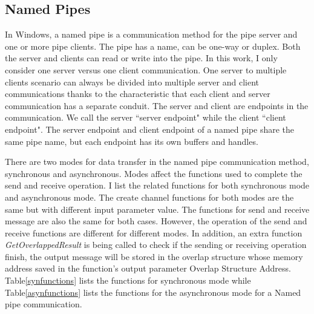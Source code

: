 \subsection{Named Pipes}
In Windows, a named pipe is a communication method for the pipe server and one or more pipe clients. The pipe has a name, can be one-way or duplex. Both the server and clients can read or write into the pipe.\cite{WinNamedpipe} In this work, I only consider one server versus one client communication. One server to multiple clients scenario can always be divided into multiple server and client communications thanks to the characteristic that each client and server communication has a separate conduit. The server and client are endpoints in the communication. We call the server ``server endpoint" while the client ``client endpoint".  The server endpoint and client endpoint of a named pipe share the same pipe name, but each endpoint has its own buffers and handles. 

There are two modes for data transfer in the named pipe communication method, synchronous and asynchronous.  Modes affect the functions used to complete the send and receive operation. I list the related functions for both synchronous mode and asynchronous mode. The create channel functions for both modes are the same but with different input parameter value. The functions for send and receive message are also the same for both cases. However, the operation of the send and receive functions are different for different modes. In addition, an extra function \textit{GetOverlappedResult} is being called to check if the sending or receiving operation finish, the output message will be stored in the overlap structure whose memory address saved in the function's output parameter Overlap Structure Address. Table\ref{synfunctions} lists the functions for synchronous mode while Table\ref{asynfunctions} lists the functions for the asynchronous mode for a Named pipe communication.

